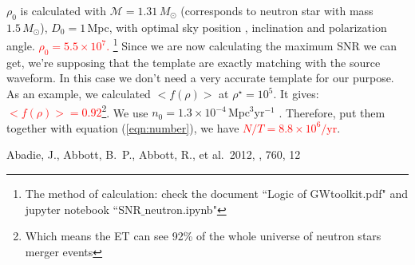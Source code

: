 \documentclass[fleqn,usenatbib]{mnras}
\begin{document}
$\rho_0$ is calculated with $\mathcal{M}=1.31\,M_\odot$ (corresponds to neutron star with mass $1.5\,M_\odot$), $D_0=1$\,Mpc, with optimal sky position , inclination and polarization angle. \textcolor{red}{$\rho_0=5.5\times10^7$.} \footnote{The method of calculation: check the document ``Logic of GWtoolkit.pdf" and jupyter notebook ``SNR$\_$neutron.ipynb"} Since we are now calculating the maximum SNR we can get, we're supposing that the template are exactly matching with the source waveform. In this case we don't need a very accurate template for our purpose. As an example, we calculated $<f(\rho)>$ at $\rho^\star=10^5$. It gives: \textcolor{red}{$<f(\rho)>=0.92$}\footnote{Which means the ET can see 92\% of the whole universe of neutron stars merger events}. We use $n_0=1.3\times10^{-4}\,\text{Mpc}^3\text{yr}^{-1}$ \citep{2012ApJ...760...12A}. Therefore, put them together with equation (\ref{eqn:number}), we have \textcolor{red}{$N/T=8.8\times10^6/\text{yr}$}. 

\begin{thebibliography}{99}
 Abadie, J., Abbott, B.~P., Abbott, R., et al.\ 2012, \apj, 760, 12
\end{thebibliography}
\end{document}
